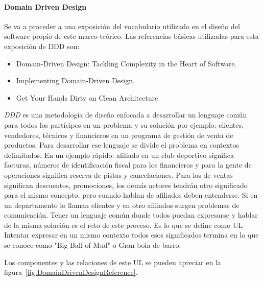 
\paragraph{Domain Driven Design}
Se va a proceder a una exposición del vocabulario utilizado en el diseño del software propio de este marco teórico. Las referencias básicas utilizadas para esta exposición de \gls{DDD} son:

\begin{itemize}
    \item Domain-Driven Design: Tackling Complexity in the Heart of Software.\cite{EricEvans2003DDTC}
    \item Implementing Domain-Driven Design.\cite{VaughnVernon2013IDD}
    \item Get Your Hands Dirty on Clean Architecture\cite{TomHombergs2019GYHD}
\end{itemize}

\textit{DDD} es una metodología de diseño enfocada a desarrollar un lenguaje común para todos los partícipes en un problema y su solución por ejemplo: clientes, vendedores, técnicos y financieros en un programa de gestión de venta de productos. Para desarrollar ese lenguaje se divide el problema en contextos delimitados. En un ejemplo rápido: afiliado en un club deportivo significa facturas, números de identificación fiscal para los financieros y para la gente de operaciones significa reserva de pistas y cancelaciones. Para los de ventas significan descuentos, promociones, los demás actores tendrán otro significado para el mismo concepto. pero cuando hablan de afiliados deben entenderse. Si en un departamento lo llaman clientes y en otro afiliados surgen problemas de comunicación. Tener un lenguaje común donde todos puedan expresarse y hablar de la misma solución es el reto de este proceso. Es lo que se define como \gls{UL} Intentar expresar en un mismo contexto todos esos significados termina en lo que se conoce como "Big Ball of Mud" o Gran bola de barro.


Los componentes y las relaciones de este UL se pueden apreciar en la figura~\cref{fig:DomainDrivenDesignReference}.

